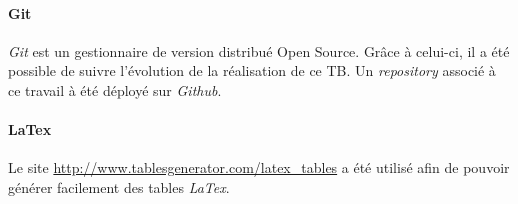 \paragraph{Git}
\textit{Git} est un gestionnaire de version distribué Open Source. Grâce à celui-ci, il a été possible de suivre l'évolution de la réalisation de ce TB. Un \textit{repository} associé à ce travail à été déployé sur \textit{Github}.

\paragraph{LaTex}
Le site \url{http://www.tablesgenerator.com/latex_tables} a été utilisé afin de pouvoir générer facilement des tables \textit{LaTex}.



